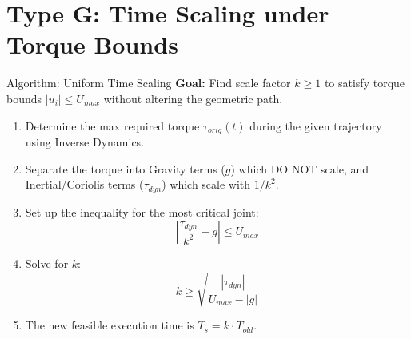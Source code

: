 \documentclass[11pt,a4paper]{article}
\begin{document}
\section{Type G: Time Scaling under Torque Bounds}

{Algorithm: Uniform Time Scaling}
\textbf{Goal:} Find scale factor $k \ge 1$ to satisfy torque bounds $|u_i| \le U_{max}$ without altering the geometric path.
\begin{enumerate}
    \item Determine the max required torque $\tau_{orig}(t)$ during the given trajectory using Inverse Dynamics.
    \item Separate the torque into Gravity terms ($g$) which DO NOT scale, and Inertial/Coriolis terms ($\tau_{dyn}$) which scale with $1/k^2$.
    \item Set up the inequality for the most critical joint:
    \begin{equation}
        \left| \frac{\tau_{dyn}}{k^2} + g \right| \leq U_{max}
    \end{equation}
    \item Solve for $k$:
    \begin{equation}
        k \geq \sqrt{\frac{|\tau_{dyn}|}{U_{max} - |g|}}
    \end{equation}
    \item The new feasible execution time is $T_s = k \cdot T_{old}$.
\end{enumerate}
\end{document}
